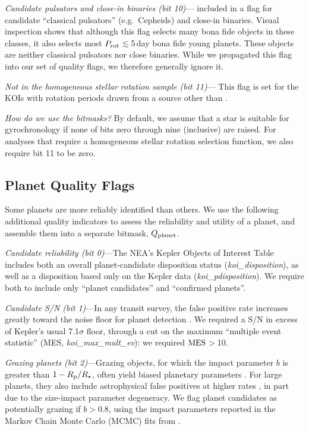 \documentclass[11pt,twocolumn,tighten]{aastex63}
\begin{document}
{\it Candidate pulsators and close-in binaries (bit
10)}---\citeauthor{Santos_2021} included in a flag for candidate
``classical pulsators'' (e.g.\ Cepheids) and close-in binaries.
Visual inspection shows that although this flag selects many bona fide
objects in these classes, it also selects most $P_{\rm
rot}$$\lesssim$5\,day bona fide young planets.  These objects are
neither classical pulsators nor close binaries.  While we propagated
this flag into our set of quality flags, we therefore generally ignore
it.

{\it Not in the homogeneous stellar rotation sample (bit 11)}--- This
flag is set for the KOIs with rotation periods drawn from a source
other than \citet{Santos_2019,Santos_2021}.


{\it How do we use the bitmasks?} By default, we assume that a star
is suitable for gyrochronology if none of bits zero through nine
(inclusive) are raised.  For analyses that require a homogeneous
stellar rotation selection function, we also require bit 11 to be
zero. 


\subsection{Planet Quality Flags}
\label{subsec:plflags}
Some planets are more reliably identified than others.  We use the
following additional quality indicators to assess the reliability and
utility of a planet, and assemble them into a separate bitmask,
$Q_{\rm planet}$.

{\it Candidate reliability (bit 0)}---The NEA's Kepler Objects of
Interest Table includes both an overall planet-candidate disposition
status ({\it koi\_disposition}), as well as a disposition based only
on the Kepler data ({\it koi\_pdisposition}).  We require both to
include only ``planet candidates'' and ``confirmed planets''. 

{\it Candidate S/N (bit 1)}---In any transit survey, the false
positive rate increases greatly toward the noise floor for planet
detection \citep[e.g.][]{2002ApJ...564..495J}.  We required a S/N in
excess of Kepler's usual 7.1$\sigma$ floor, through a cut on the
maximum ``multiple event statistic'' (MES, {\it koi\_max\_mult\_ev}):
we required ${\rm MES}$$>$10.

{\it Grazing planets (bit 2)}---Grazing objects, for which the impact
parameter $b$ is greater than $1-R_{\rm p}/R_\star$, often yield
biased planetary parameters \citep[e.g.][]{2022AJ....163..111G}.  For
large planets, they also include astrophysical false positives at
higher rates \citep{2016ApJ...822...86M}, in part due to the
size-impact parameter degeneracy.  We flag planet candidates as
potentially grazing if $b>0.8$, using the impact parameters reported
in the Markov Chain Monte Carlo (MCMC) fits from
\citet{Thompson_2018}.
\end{document}
